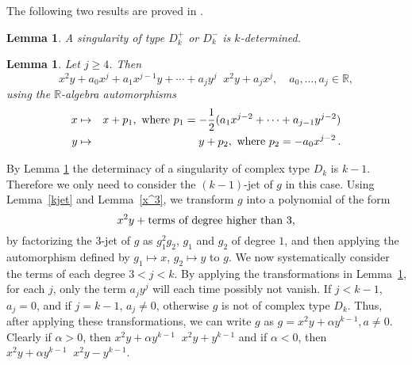 \documentclass[noend]{amsproc}
\DeclareMathOperator{\requiv}{\overset{r}{\sim}}
\begin{document}
The following two results are proved in \cite{Siersma}.

\newtheorem{kDeterminacyD[k]k>4}[kjet]{Lemma}
\begin{kDeterminacyD[k]k>4}\label{kDeterminacyD[k]k>4}
A singularity of type $D_k^+$ or $D_k^-$ is $k$-determined.
\end{kDeterminacyD[k]k>4}
\newtheorem{transformationD[k]}[kjet]{Lemma}
\begin{transformationD[k]}\label{transformationD[k]}
Let $j\ge 4$. Then
\[
x^2y+a_0x^j+a_1x^{j-1}y+\cdots+a_jy^j\requiv x^2y+a_jx^j,
\quad a_0,\ldots,a_j\in\mathbb R,
\]
using the $\mathbb R$-algebra automorphisms
\begin{eqnarray*}
x&\mapsto&x+p_1,\textnormal{ where }
p_1=-\frac{1}{2}(a_1x^{j-2}+\cdots+a_{j-1}y^{j-2})\\
y&\mapsto&y+p_2,\textnormal{ where } p_2=-a_0x^{j-2} \,.
\end{eqnarray*}
\end{transformationD[k]}

By Lemma \ref{kDeterminacyD[k]k>4} the determinacy of a singularity of  complex
type
$D_k$ is $k-1$. Therefore we only need to consider the
$(k-1)$-jet of $g$ in this case. Using Lemma~\ref{kjet} and Lemma~\ref{x^3}, we
transform $g$ into a polynomial of the form
\[x^2y+\textnormal{terms of degree higher than $3$,}\]
by factorizing the $3$-jet of $g$ as $g_1^2g_2$, $g_1$ and $g_2$ of
degree $1$,
and then applying the automorphism defined by $g_1\mapsto x$, $g_2\mapsto y$ to
$g$. We
now systematically consider the terms of each degree $3<j<k$. By applying the
transformations in Lemma~\ref{transformationD[k]}, for each $j$, only the term
$a_jy^j$ will each time possibly not vanish. If $j<k-1$, $a_j=0$, and if
$j=k-1$, $a_j\neq 0$, otherwise $g$ is not of complex type
$D_k$. Thus, after applying these transformations,
we can write $g$ as $g=x^2y+\alpha y^{k-1}, a\neq0$. Clearly if $\alpha>0$, then
$x^2y+\alpha y^{k-1}\requiv x^2y+y^{k-1}$ and if $\alpha<0$, then
$x^2y+\alpha y^{k-1}\requiv x^2y-y^{k-1}$.
\end{document}
